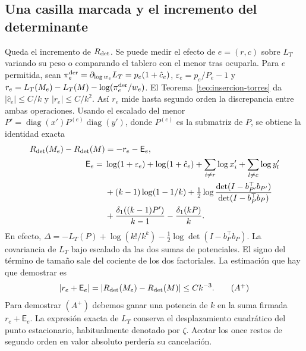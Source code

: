 \subsection{Una casilla marcada y el incremento del determinante \texorpdfstring{}{[D]}}
Queda el incremento de $R_{\rm det}$. Se puede medir el efecto de $e=(r,c)$ sobre $L_T$
variando su peso o comparando el tablero con el menor tras ocuparla. Para $e$ permitida, sean
$\pi^{\rm der}_e=\partial_{\log w_e}L_T=p_e(1+\hat c_e)$,
$\varepsilon_e=p_e/P_e-1$ y
$r_e=L_T(M_e)-L_T(M)-\log(\pi^{\rm der}_e/w_e)$.
El Teorema~\ref{teo:insercion-torres} da $|\hat c_e|\le C/k$ y $|r_e|\le C/k^2$. Así $r_e$ mide hasta
segundo orden la discrepancia entre ambas operaciones. Usando el escalado
del menor $P'=\operatorname{diag}(x')P^{(e)}\operatorname{diag}(y')$, donde $P^{(e)}$ es la
submatriz de $P$, se obtiene la identidad exacta
\begin{align*}
 R_{\rm det}(M_e)-R_{\rm det}(M)&=-r_e-\mathsf E_e,\\
 \mathsf E_e={}&\log(1+\varepsilon_e)+\log(1+\hat c_e)
          +\sum_{i\ne r}\log x'_i+\sum_{l\ne c}\log y'_l\\
 &+(k-1)\log(1-1/k)
  +\tfrac12\log\frac{\det(I-b_{P'}^\top b_{P'})}{\det(I-b_P^\top b_P)}\\
 &+\frac{\delta_1((k-1)P')}{k-1}-\frac{\delta_1(kP)}k .
\end{align*}
En efecto, $\Delta=-L_T(P)+\log(k!/k^k)-\frac12\log\det(I-b_P^\top b_P)$.
La covariancia de $L_T$ bajo escalado da las dos sumas de potenciales. El signo del término de
tamaño sale del cociente de los dos factoriales. La estimación que hay que demostrar es
\[
 |r_e+\mathsf E_e|=|R_{\rm det}(M_e)-R_{\rm det}(M)|\le Ck^{-3}. \tag{$A^+$}
\]
Para demostrar $(A^+)$ debemos ganar una potencia
de $k$ en la suma firmada $r_e+\mathsf E_e$. La expresión exacta de $L_T$ conserva el
desplazamiento cuadrático del punto estacionario, habitualmente denotado por $\zeta$. Acotar los
once restos de segundo orden en valor absoluto perdería su cancelación.

